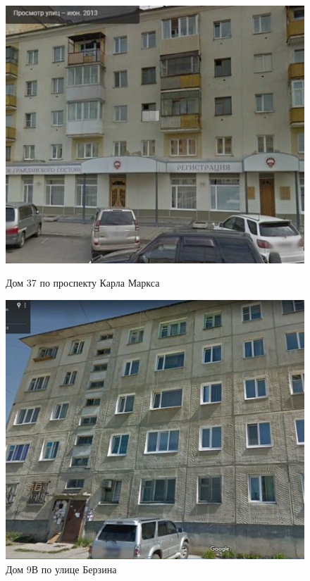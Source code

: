 \begin{figure}[H]
\begin{changemargin}{-1cm}{-1cm}
  \begin{center}
    \begin{minipage}[h]{0.46\linewidth}
        \includegraphics[width=1\textwidth]{authors/sydchak-fig-3.jpg}
        \caption{Дом 37 по проспекту Карла Маркса}
        \label{fig:sydchak-fig-3}
    \end{minipage}
\hfill
    \begin{minipage}[h]{0.46\linewidth}
        \includegraphics[width=1\textwidth]{authors/sydchak-fig-4.jpg}
        \caption{Дом 9В по улице Берзина}
        \label{fig:sydchak-fig-4}
    \end{minipage}


  \end{center}
\end{changemargin}

\end{figure}
